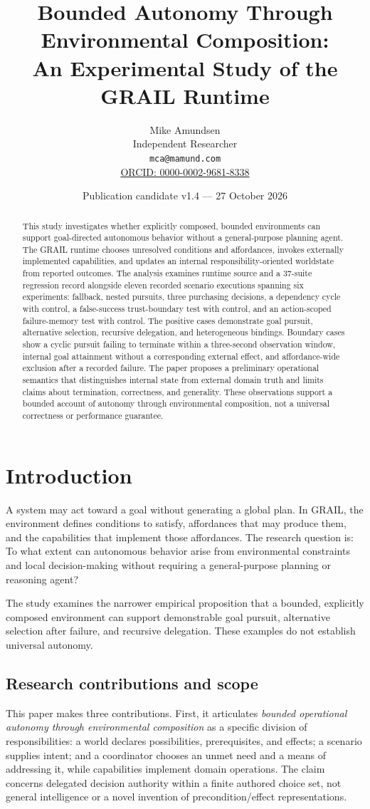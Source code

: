 \documentclass[11pt]{article}
\title{Bounded Autonomy Through Environmental Composition:\\An Experimental Study of the GRAIL Runtime}
\author{Mike Amundsen\\Independent Researcher\\\texttt{mca@mamund.com}\\\href{https://orcid.org/0000-0002-9681-8338}{ORCID: 0000-0002-9681-8338}}
\date{Publication candidate v1.4 --- 27 October 2026}
\begin{document}
\maketitle
\begin{abstract}
This study investigates whether explicitly composed, bounded environments can support goal-directed autonomous behavior without a general-purpose planning agent. The GRAIL runtime chooses unresolved conditions and affordances, invokes externally implemented capabilities, and updates an internal responsibility-oriented worldstate from reported outcomes. The analysis examines runtime source and a 37-suite regression record alongside eleven recorded scenario executions spanning six experiments: fallback, nested pursuits, three purchasing decisions, a dependency cycle with control, a false-success trust-boundary test with control, and an action-scoped failure-memory test with control. The positive cases demonstrate goal pursuit, alternative selection, recursive delegation, and heterogeneous bindings. Boundary cases show a cyclic pursuit failing to terminate within a three-second observation window, internal goal attainment without a corresponding external effect, and affordance-wide exclusion after a recorded failure. The paper proposes a preliminary operational semantics that distinguishes internal state from external domain truth and limits claims about termination, correctness, and generality. These observations support a bounded account of autonomy through environmental composition, not a universal correctness or performance guarantee.
\end{abstract}
\section{Introduction}
A system may act toward a goal without generating a global plan. In GRAIL, the environment defines conditions to satisfy, affordances that may produce them, and the capabilities that implement those affordances. The research question is: To what extent can autonomous behavior arise from environmental constraints and local decision-making without requiring a general-purpose planning or reasoning agent?

The study examines the narrower empirical proposition that a bounded, explicitly composed environment can support demonstrable goal pursuit, alternative selection after failure, and recursive delegation. These examples do not establish universal autonomy.

\subsection{Research contributions and scope}
This paper makes three contributions. First, it articulates \emph{bounded operational autonomy through environmental composition} as a specific division of responsibilities: a world declares possibilities, prerequisites, and effects; a scenario supplies intent; and a coordinator chooses an unmet need and a means of addressing it, while capabilities implement domain operations. The claim concerns delegated decision authority within a finite authored choice set, not general intelligence or a novel invention of precondition/effect representations.
\end{document}
